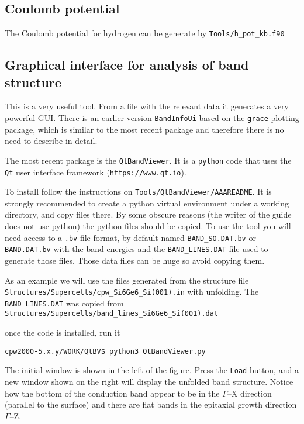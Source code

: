 \documentclass[11pt]{article}
\begin{document}
\subsection{Coulomb potential}

The Coulomb potential for hydrogen can be generate by \texttt{Tools/h\_pot\_kb.f90}

\subsection{Graphical interface for analysis of band structure}

This is a very useful tool.  From a file with the relevant data
it generates a very powerful GUI.  There is an earlier version \texttt{BandInfoUi}
based on the \texttt{grace} plotting package, which is similar to the most recent
package and therefore there is no need to describe in detail.

The most recent package is the \texttt{QtBandViewer}.  It is a \texttt{python}
code that uses the \texttt{Qt} user interface framework (\texttt{https://www.qt.io}).

To install follow the instructions on \texttt{Tools/QtBandViewer/AAAREADME}.
It is strongly recommended to create a python virtual environment under a working directory,
and copy files there.  By some obscure reasons (the writer of the guide does not
use python) the python files should be copied.  To use the tool you will need access to
a \texttt{.bv} file format, by default named \texttt{BAND\_SO.DAT.bv} or
\texttt{BAND.DAT.bv} with the band energies and the \texttt{BAND\_LINES.DAT} file
used to generate those files.  Those data files can be huge so avoid copying
them.

As an example we will use the files generated from the structure
file \texttt{Structures/Supercells/cpw\_Si6Ge6\_Si(001).in} with
unfolding.  The \texttt{BAND\_LINES.DAT} was copied from
\texttt{Structures/Supercells/band\_lines\_Si6Ge6\_Si(001).dat}


once the code is installed, run it

\noindent\texttt{cpw2000-5.x.y/WORK/QtBV\$ python3 QtBandViewer.py}

\noindent
The initial window is shown in the left of the figure.  Press the \texttt{Load} button,
and a new window shown on the right will display the
unfolded band structure.   Notice how the bottom of the conduction
band appear to be in the $\Gamma$--X direction (parallel to the
surface) and there are flat bands in the epitaxial growth direction
$\Gamma$--Z.
\end{document}

